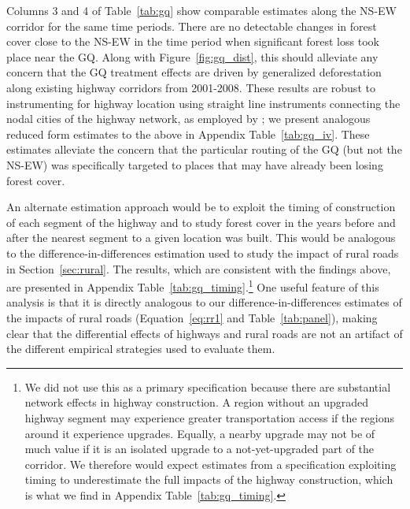 Columns 3 and 4 of Table~\ref{tab:gq} show comparable estimates along
the NS-EW corridor for the same time periods.  There are no detectable
changes in forest cover close to the NS-EW in the time period when
significant forest loss took place near the GQ. Along with
Figure~\ref{fig:gq_dist}, this should alleviate any concern that the
GQ treatment effects are driven by generalized deforestation along
existing highway corridors from 2001-2008.  These results are robust
to instrumenting for highway location using straight line instruments
connecting the nodal cities of the highway network, as employed by
; we present analogous reduced form estimates to the
above in Appendix Table~\ref{tab:gq_iv}. These estimates alleviate the
concern that the particular routing of the GQ (but not the NS-EW) was
specifically targeted to places that may have already been losing
forest cover.

An alternate estimation approach would be to exploit the timing of
construction of each segment of the highway and to study forest cover
in the years before and after the nearest segment to a given location
was built. This would be analogous to the difference-in-differences
estimation used to study the impact of rural roads in
Section~\ref{sec:rural}. The results, which are consistent with the
findings above, are presented in Appendix
Table~\ref{tab:gq_timing}.\footnote{We did not use this as a primary
  specification because there are substantial network effects in
  highway construction. A region without an upgraded highway segment
  may experience greater transportation access if the regions around
  it experience upgrades. Equally, a nearby upgrade may not be of much
  value if it is an isolated upgrade to a not-yet-upgraded part of the
  corridor. We therefore would expect estimates from a specification
  exploiting timing to underestimate the full impacts of the highway
  construction, which is what we find in Appendix
  Table~\ref{tab:gq_timing}.} One useful feature of this analysis is
that it is directly analogous to our difference-in-differences
estimates of the impacts of rural roads (Equation~\ref{eq:rr1} and
Table~\ref{tab:panel}), making clear that the differential effects of
highways and rural roads are not an artifact of the different
empirical strategies used to evaluate them.

